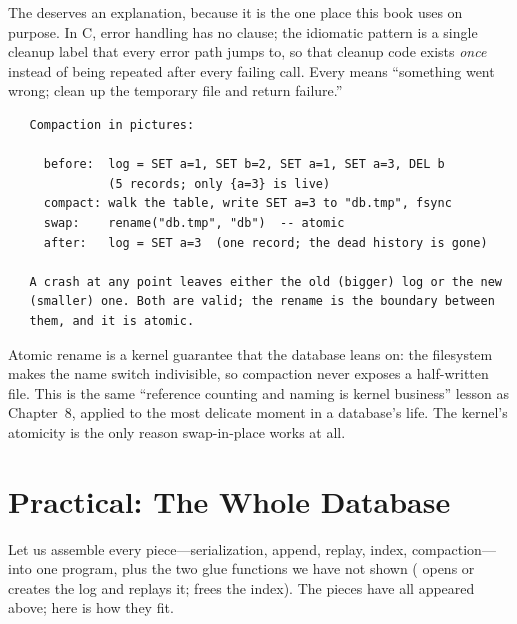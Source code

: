 The  deserves an explanation, because it is the one
place this book uses  on purpose. In C, error handling has
no  clause; the idiomatic pattern is a single cleanup
label that every error path jumps to, so that cleanup code exists
\emph{once} instead of being repeated after every failing call.
Every  means ``something went wrong; clean up the
temporary file and return failure.''

\begin{verbatim}
   Compaction in pictures:

     before:  log = SET a=1, SET b=2, SET a=1, SET a=3, DEL b
              (5 records; only {a=3} is live)
     compact: walk the table, write SET a=3 to "db.tmp", fsync
     swap:    rename("db.tmp", "db")  -- atomic
     after:   log = SET a=3  (one record; the dead history is gone)

   A crash at any point leaves either the old (bigger) log or the new
   (smaller) one. Both are valid; the rename is the boundary between
   them, and it is atomic.
\end{verbatim}

\begin{osconcept}
Atomic rename is a kernel guarantee that the database leans on: the
filesystem makes the name switch indivisible, so compaction never
exposes a half-written file. This is the same ``reference counting and
naming is kernel business'' lesson as Chapter~8, applied to the most
delicate moment in a database's life. The kernel's atomicity is the
only reason swap-in-place works at all.
\end{osconcept}

\section{Practical: The Whole Database}

Let us assemble every piece---serialization, append, replay, index,
compaction---into one program, plus the two glue functions we have not
shown ( opens or creates the log and replays it;
 frees the index). The pieces have all appeared above;
here is how they fit.

